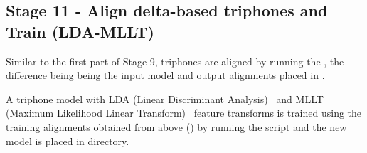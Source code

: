\subsection{ Stage 11 - Align delta-based triphones and Train (LDA-MLLT)}
Similar to the first part of Stage 9, triphones are aligned by running the  , the difference being  being the input model and output alignments placed in .

A triphone model with LDA (Linear Discriminant Analysis)~\cite{kaldilda} and MLLT (Maximum Likelihood Linear Transform)~\cite{kaldimllt} feature transforms is trained using the training alignments obtained from above () by running the  script and the new model is placed in  directory.

